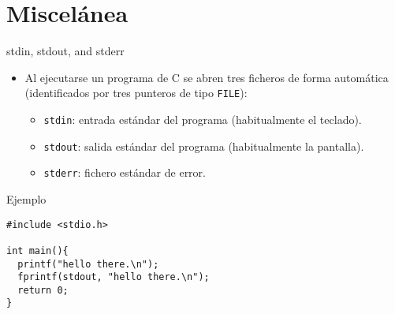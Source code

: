 \documentclass[xcolor={usenames,svgnames,dvipsnames}, aspectratio=169]{beamer}
\begin{document}
\section{Miscelánea}
\label{sec:org9b8ba8a}
\begin{frame}[label={sec:orgb974ce7},fragile]{stdin, stdout, and stderr}
 \begin{itemize}
\item Al ejecutarse un programa de C se abren tres ficheros de forma automática (identificados por tres punteros de tipo \texttt{FILE}):

\begin{itemize}
\item \texttt{stdin}: entrada estándar del programa (habitualmente el teclado).

\item \texttt{stdout}: salida estándar del programa (habitualmente la pantalla).

\item \texttt{stderr}: fichero estándar de error.
\end{itemize}
\end{itemize}

\begin{block}{Ejemplo}
\lstset{language=C,label= ,caption= ,captionpos=b,numbers=none}
\begin{lstlisting}
#include <stdio.h>

int main(){
  printf("hello there.\n");
  fprintf(stdout, "hello there.\n");
  return 0;
}
\end{lstlisting}
\end{block}
\end{frame}
\end{document}
